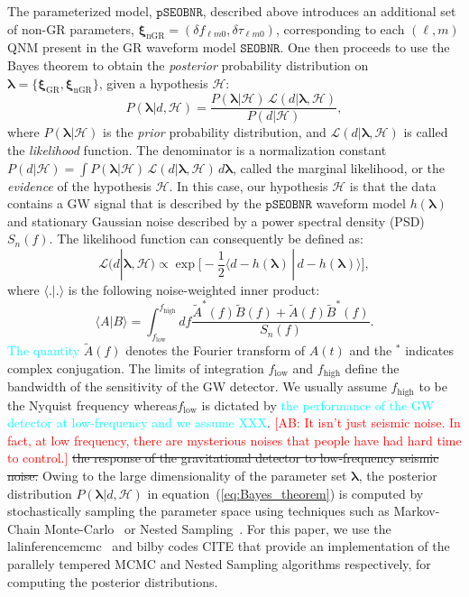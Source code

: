 \documentclass[twocolumn,prd,aps,superscriptaddress,preprintnumbers,tightenlines,showpacs,nofootinbib,eqsecnum,amsfonts,amsmath]{revtex4-1}
\newcommand{\ab}[1]{\textcolor{cyan}{#1}}
\newcommand{\comment}[1]{\textcolor{red}{[#1]}}
\newcommand{\blambda}{\bm{\lambda}}
\newcommand{\bxigr}{\bm{\xi}_{\text{GR}}}
\newcommand{\bxingr}{\bm{\xi}_{\text{nGR}}}
\newcommand{\pSEOB}{\texttt{pSEOBNR}}
\newcommand{\SEOB}{\texttt{SEOBNR}}
\begin{document}
The parameterized model, $\pSEOB$, described above introduces an additional set of non-GR parameters, $\bxingr = (\delta f_{\ell m 0},\delta \tau_{\ell m 0})$, corresponding to each $(\ell,m)$ QNM present in the GR waveform model $\SEOB$. One then proceeds to use the Bayes theorem to obtain the \emph{posterior} probability distribution on $\blambda = \{\bxigr, \bxingr\}$, given a hypothesis $\mathcal{H}$:
%
\begin{equation}
P(\blambda | d, \mathcal{H}) = \frac{P(\blambda | \mathcal{H}) \, \mathcal{L}(d | \blambda, \mathcal{H})}{P(d|\mathcal{H})},
\label{eq:Bayes_theorem}
\end{equation}
%
where $P(\blambda | \mathcal{H})$ is the \emph{prior} probability distribution, and $\mathcal{L}(d | \blambda, \mathcal{H})$ is called the \emph{likelihood} function. The denominator is a normalization constant $P(d|\mathcal{H}) = \int P(\blambda | \mathcal{H}) \, \mathcal{L}(d | \blambda, \mathcal{H}) \, d\blambda$, called the marginal likelihood, or the \emph{evidence} of the hypothesis $\mathcal{H}$. In this case, our hypothesis $\mathcal{H}$ is that the data contains a GW signal that is described by the $\pSEOB$ waveform model $h(\blambda)$  and stationary Gaussian noise described by a power spectral density (PSD) $S_n(f)$. The likelihood function can consequently be defined as:
%
\begin{equation}
\mathcal{L}(d | \blambda, \mathcal{H}) \propto \exp\big[-\frac{1}{2} \langle d - h(\blambda) \, | \, d -h(\blambda) \rangle \big],
\label{eq:likelihood}
\end{equation}
%
where $\langle . | . \rangle$ is the following noise-weighted inner product:
%
\begin{equation}
\langle A | B \rangle = \int_{f_\mathrm{low}} ^{f_\mathrm{high}} df \frac{\tilde{A}^*(f)\tilde{B}(f) + \tilde{A}(f)\tilde{B}^*(f)}{S_n(f)}.
\label{eq:nwip}
\end{equation}
%
\ab{The quantity} $\tilde{A}(f)$ denotes the Fourier transform of $A(t)$ and the $^*$ indicates complex conjugation. The limits of integration ${f_\mathrm{low}}$ and ${f_\mathrm{high}}$ define the bandwidth of the sensitivity of the GW detector. We usually assume ${f_\mathrm{high}}$ to be the Nyquist frequency whereas${f_\mathrm{low}}$ is dictated by \ab{the performance of the 
GW detector at low-frequency and we assume XXX}. \comment{AB: It isn't just seismic noise. In fact, at low frequency, there are mysterious noises that people have had hard time 
to control.} \sout{the response of the gravitational detector to low-frequency seismic noise.} Owing to the large dimensionality of the parameter set $\blambda$, the posterior distribution $P(\blambda | d, \mathcal{H})$ in equation~(\ref{eq:Bayes_theorem}) is computed by stochastically sampling the parameter space using techniques such as Markov-Chain Monte-Carlo~\cite{xxx} or Nested Sampling~\cite{xxx}. For this paper, we use the lalinferencemcmc~\cite{xx} and bilby codes CITE that provide an implementation of the parallely tempered MCMC and Nested Sampling algorithms respectively, for computing the posterior distributions. 
\end{document}
